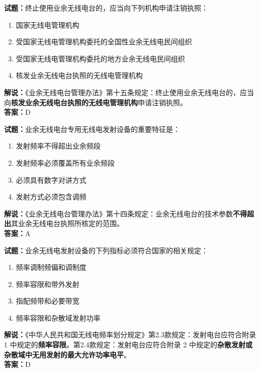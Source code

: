 \documentclass{ctexbook}
\begin{document}
\bigskip


\noindent\textbf{试题：}终止使用业余无线电台的，应当向下列机构申请注销执照：
\begin{enumerate}[leftmargin=3em]
\item 国家无线电管理机构
\item 受国家无线电管理机构委托的全国性业余无线电民间组织
\item 受国家无线电管理机构委托的地方业余无线电民间组织
\item 核发业余无线电台执照的无线电管理机构
\end{enumerate}
\noindent\textbf{解说：}《业余无线电台管理办法》第十五条规定：终止使用业余无线电台的，应当向\textbf{核发业余无线电台执照的无线电管理机构}申请注销执照。\\\noindent\textbf{答案：}D




\bigskip


\noindent\textbf{试题：}业余无线电台专用无线电发射设备的重要特征是：
\begin{enumerate}[leftmargin=3em]
\item 发射频率不得超出业余频段
\item 发射频率必须覆盖所有业余频段
\item 必须具有数字对讲方式
\item 发射方式必须包含调频
\end{enumerate}
\noindent\textbf{解说：}《业余无线电台管理办法》第十四条规定：业余无线电台的技术参数\textbf{不得超出}其业余无线电台执照所核定的范围。\\\noindent\textbf{答案：}A




\bigskip


\noindent\textbf{试题：}业余无线电发射设备的下列指标必须符合国家的相关规定：
\begin{enumerate}[leftmargin=3em]
\item 频率调制频偏和调制度
\item 频率容限和带外发射
\item 指配频带和必要带宽
\item 频率容限和杂散域发射功率
\end{enumerate}
\noindent\textbf{解说：}《中华人民共和国无线电频率划分规定》第2.3款规定：发射电台应符合附录 1 中规定的\textbf{频率容限}。第2.4款规定：发射电台应符合附录 2 中规定的\textbf{杂散发射或杂散域中无用发射的最大允许功率电平}。\\\noindent\textbf{答案：}D
\end{document}
